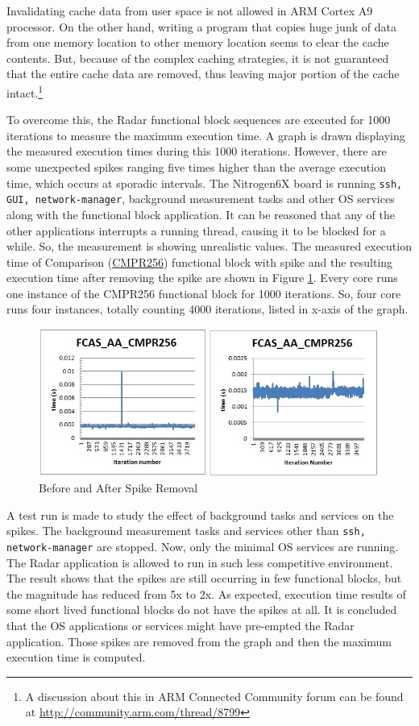 Invalidating cache data from user space is not allowed in ARM Cortex A9 processor. On the other hand, writing a program that copies huge junk of data from one memory location to other memory location seems to clear the cache contents. But, because of the complex caching strategies, it is not guaranteed that the entire cache data are removed, thus leaving major portion of the cache intact.\footnote{A discussion about this in ARM Connected Community forum can be found at \url{http://community.arm.com/thread/8799}} 

To overcome this, the Radar functional block sequences are executed for 1000 iterations to measure the maximum execution time. A graph is drawn displaying the measured execution times during this 1000 iterations. However, there are some unexpected spikes ranging five times higher than the average execution time, which occurs at sporadic intervals. The Nitrogen6X board is running \texttt{ssh, GUI, network-manager}, background measurement tasks and other OS services along with the functional block application. It can be reasoned that any of the other applications interrupts a running thread, causing it to be blocked for a while. So, the measurement is showing unrealistic values. The measured execution time of Comparison (\hyperlink{benchmarks}{CMPR256}) functional block with spike and the resulting execution time after removing the spike are shown in Figure \ref{fig:mm:chop_off}. Every core runs one instance of the CMPR256 functional block for 1000 iterations. So, four core runs four instances, totally counting 4000 iterations, listed in x-axis of the graph.

\begin{figure}[h!]
	\centering
	\includegraphics[width=150mm]{figures/chop_off}
	\caption{Before and After Spike Removal}
	\label{fig:mm:chop_off}
\end{figure}
A test run is made to study the effect of background tasks and services on the spikes. The background measurement tasks and services other than \verb|ssh, network-manager| are stopped. Now, only the minimal OS services are running. The Radar application is allowed to run in such less competitive environment. The result shows that the spikes are still occurring in few functional blocks, but the magnitude has reduced from 5x to 2x. As expected, execution time results of some short lived functional blocks do not have the spikes at all. It is concluded that the OS applications or services might have pre-empted the Radar application. Those spikes are removed from the graph and then the maximum execution time is computed. \vspace*{0.2cm}

